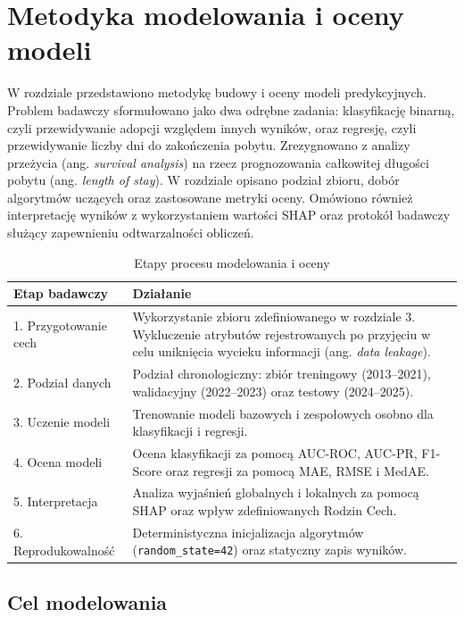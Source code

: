 \chapter{Metodyka modelowania i oceny modeli}
\label{chap:metodyka-modelowania}

W rozdziale przedstawiono metodykę budowy i oceny modeli predykcyjnych. Problem badawczy sformułowano jako dwa odrębne zadania: klasyfikację binarną, czyli przewidywanie adopcji względem innych wyników, oraz regresję, czyli przewidywanie liczby dni do zakończenia pobytu. Zrezygnowano z analizy przeżycia (ang. \emph{survival analysis}) na rzecz prognozowania całkowitej długości pobytu (ang. \emph{length of stay}). W rozdziale opisano podział zbioru, dobór algorytmów uczących oraz zastosowane metryki oceny. Omówiono również interpretację wyników z wykorzystaniem wartości SHAP oraz protokół badawczy służący zapewnieniu odtwarzalności obliczeń.

\begin{table}[htbp]
\centering
\caption{Etapy procesu modelowania i oceny}
\label{tab:etapy-procesu-modelowania}
\small
\begin{tabular}{|p{}|p{}|}
\hline
\rowcolor{LightGray}
\textbf{Etap badawczy} & \textbf{Działanie} \\
\hline
1. Przygotowanie cech & Wykorzystanie zbioru zdefiniowanego w rozdziale 3. Wykluczenie atrybutów rejestrowanych po przyjęciu w celu uniknięcia wycieku informacji (ang. \emph{data leakage}). \\
\hline
2. Podział danych & Podział chronologiczny: zbiór treningowy (2013--2021), walidacyjny (2022--2023) oraz testowy (2024--2025). \\
\hline
3. Uczenie modeli & Trenowanie modeli bazowych i zespołowych osobno dla klasyfikacji i regresji. \\
\hline
4. Ocena modeli & Ocena klasyfikacji za pomocą AUC-ROC, AUC-PR, F1-Score oraz regresji za pomocą MAE, RMSE i MedAE. \\
\hline
5. Interpretacja & Analiza wyjaśnień globalnych i lokalnych za pomocą SHAP oraz wpływ zdefiniowanych Rodzin Cech. \\
\hline
6. Reprodukowalność & Deterministyczna inicjalizacja algorytmów (\texttt{random\_state=42}) oraz statyczny zapis wyników. \\
\hline
\end{tabular}
\end{table}

\section{Cel modelowania}
\label{sec:cel-modelowania}

